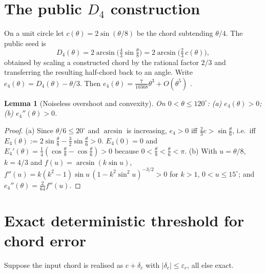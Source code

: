 \documentclass[11pt]{article}
\newtheorem{lemma}[theorem]{Lemma}
\theoremstyle{definition}
\newcommand{\eps}{\varepsilon}
\newcommand{\Dfour}{D_4}
\begin{document}
\section{The public $\Dfour$ construction}\label{sec:construction}
On a unit circle let $c(\theta)=2\sin(\theta/8)$ be the chord subtending $\theta/4$.
The public seed \cite[Sec.~3]{bakerrepo} is
\begin{equation}\label{eq:D4}
\Dfour(\theta)=2\arcsin\!\Big(\tfrac43\sin\tfrac\theta8\Big)=2\arcsin\!\Big(\tfrac23\,c(\theta)\Big),
\end{equation}
obtained by scaling a constructed chord by the rational factor $2/3$ and transferring the resulting half-chord back to an angle.
Write $e_4(\theta)=\Dfour(\theta)-\theta/3$. Then $e_4(\theta)=\tfrac{7}{10368}\theta^3+O(\theta^5)$ \cite{bakerrepo}.

\begin{lemma}[Noiseless overshoot and convexity]\label{lem:e4}
On $0<\theta\le120^\circ$: (a) $e_4(\theta)>0$; (b) $e_4''(\theta)>0$.
\end{lemma}
\begin{proof}
(a) Since $\theta/6\le20^\circ$ and $\arcsin$ is increasing, $e_4>0$ iff $\tfrac23c>\sin\tfrac\theta6$, i.e.\ iff $E_4(\theta):=2\sin\tfrac\theta8-\tfrac32\sin\tfrac\theta6>0$.
$E_4(0)=0$ and $E_4'(\theta)=\tfrac14(\cos\tfrac\theta8-\cos\tfrac\theta6)>0$ because $0<\tfrac\theta8<\tfrac\theta6<\pi$.
(b) With $u=\theta/8$, $k=4/3$ and $f(u)=\arcsin(k\sin u)$,
$f''(u)=k(k^2-1)\sin u\,(1-k^2\sin^2u)^{-3/2}>0$ for $k>1$, $0<u\le15^\circ$; and $e_4''(\theta)=\tfrac{2}{64}f''(u)$.
\end{proof}

\section{Exact deterministic threshold for chord error}\label{sec:det}
Suppose the input chord is realised as $c+\delta_c$ with $|\delta_c|\le\eps_c$, all else exact.
\end{document}
